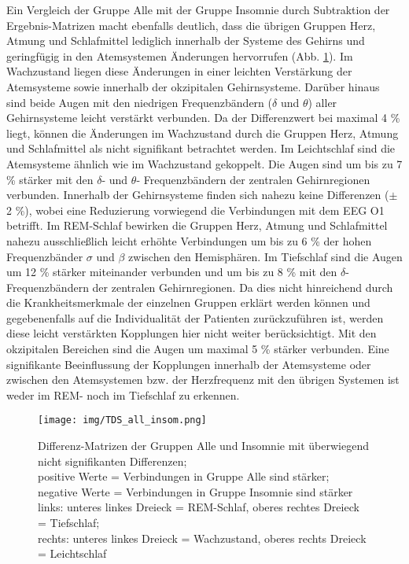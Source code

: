 Ein Vergleich der Gruppe Alle mit der Gruppe Insomnie durch Subtraktion der Ergebnis-Matrizen macht ebenfalls deutlich, dass die übrigen Gruppen Herz, Atmung und Schlafmittel lediglich innerhalb der Systeme des Gehirns und geringfügig in den Atemsystemen Änderungen hervorrufen (Abb. \ref{fig:TDSall_insom}). Im Wachzustand liegen diese Änderungen in einer leichten Verstärkung der Atemsysteme sowie innerhalb der okzipitalen Gehirnsysteme. Darüber hinaus sind beide Augen mit den niedrigen Frequenzbändern ($\delta$ und $\theta$) aller Gehirnsysteme leicht verstärkt verbunden. Da der Differenzwert bei maximal 4 \% liegt, können die Änderungen im Wachzustand durch die Gruppen Herz, Atmung und Schlafmittel als nicht signifikant betrachtet werden. Im Leichtschlaf sind die Atemsysteme ähnlich wie im Wachzustand gekoppelt. Die Augen sind um bis zu 7 \% stärker mit den $\delta$- und $\theta$- Frequenzbändern der zentralen Gehirnregionen verbunden. Innerhalb der Gehirnsysteme finden sich nahezu keine Differenzen ($\pm$ 2 \%), wobei eine Reduzierung vorwiegend die Verbindungen mit dem \acs{EEG} O1 betrifft. Im \acs{REM}-Schlaf bewirken die Gruppen Herz, Atmung und Schlafmittel nahezu ausschließlich leicht erhöhte Verbindungen um bis zu 6 \% der hohen Frequenzbänder $\sigma$ und $\beta$ zwischen den Hemisphären. Im Tiefschlaf sind die Augen um 12 \% stärker miteinander verbunden und um bis zu 8 \% mit den $\delta$-Frequenzbändern der zentralen Gehirnregionen. Da dies nicht hinreichend durch die Krankheitsmerkmale der einzelnen Gruppen erklärt werden können und gegebenenfalls auf die Individualität der Patienten zurückzuführen ist, werden diese leicht verstärkten Kopplungen hier nicht weiter berücksichtigt. Mit den okzipitalen Bereichen sind die Augen um maximal 5 \% stärker verbunden. Eine signifikante Beeinflussung der Kopplungen innerhalb der Atemsysteme oder zwischen den Atemsystemen bzw. der Herzfrequenz mit den übrigen Systemen ist weder im \acs{REM}- noch im Tiefschlaf zu erkennen.\\

\begin{figure}[H]
	\centering
	\texttt{[image: img/TDS\_all\_insom.png]}
	\caption[Differenzen zwischen Gruppe Alle und Insomnie]{Differenz-Matrizen der Gruppen Alle und Insomnie mit überwiegend nicht signifikanten Differenzen;\\positive Werte = Verbindungen in Gruppe Alle sind stärker;\\negative Werte = Verbindungen in Gruppe Insomnie sind stärker\\links: unteres linkes Dreieck = \acs{REM}-Schlaf, oberes rechtes Dreieck = Tiefschlaf;\\rechts: unteres linkes Dreieck = Wachzustand, oberes rechts Dreieck = Leichtschlaf}
	\label{fig:TDSall_insom}
\end{figure}

